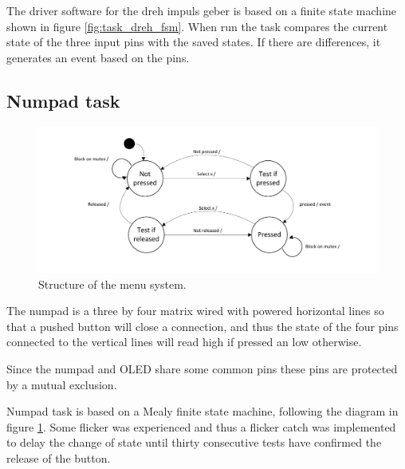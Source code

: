 The driver software for the dreh impuls geber is based on a finite state machine shown in figure \ref{fig:task_dreh_fsm}. When run the task compares the current state of the three input pins with the saved states. If there are differences, it generates an event based on the pins.

\subsection{Numpad task}
\begin{figure}[htb]
	\centering
	\includegraphics[width=\textwidth,trim=0 15 0 15]{graphics/numpad_task_fsm.pdf} 
	\caption{Structure of the menu system.}
	\label{fig:task_numpad_fsm}
\end{figure}
The numpad is a three by four matrix wired with powered horizontal lines so that a pushed button will close a connection, and thus the state of the four pins connected to the vertical lines will read high if pressed an low otherwise.

Since the numpad and OLED share some common pins these pins are protected by a mutual exclusion.

Numpad task is based on a Mealy finite state machine, following the diagram in figure \ref{fig:task_numpad_fsm}.  Some flicker was experienced and thus a flicker catch was implemented to delay the change of state until thirty consecutive tests have confirmed the release of the button.

